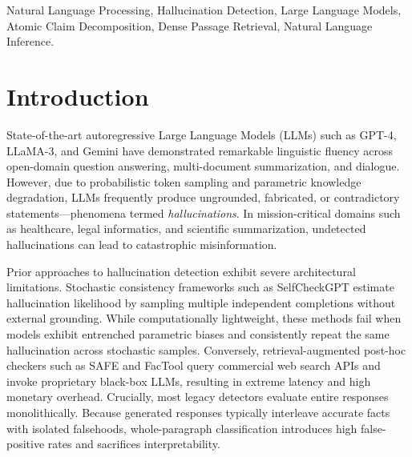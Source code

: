 \documentclass[conference]{IEEEtran}
\begin{document}
\begin{IEEEkeywords}
Natural Language Processing, Hallucination Detection, Large Language Models, Atomic Claim Decomposition, Dense Passage Retrieval, Natural Language Inference.
\end{IEEEkeywords}

\section{Introduction}
State-of-the-art autoregressive Large Language Models (LLMs) such as GPT-4, LLaMA-3, and Gemini have demonstrated remarkable linguistic fluency across open-domain question answering, multi-document summarization, and dialogue. However, due to probabilistic token sampling and parametric knowledge degradation, LLMs frequently produce ungrounded, fabricated, or contradictory statements—phenomena termed \textit{hallucinations}. In mission-critical domains such as healthcare, legal informatics, and scientific summarization, undetected hallucinations can lead to catastrophic misinformation.

Prior approaches to hallucination detection exhibit severe architectural limitations. Stochastic consistency frameworks such as SelfCheckGPT \cite{manakul2023selfcheckgpt} estimate hallucination likelihood by sampling multiple independent completions without external grounding. While computationally lightweight, these methods fail when models exhibit entrenched parametric biases and consistently repeat the same hallucination across stochastic samples. Conversely, retrieval-augmented post-hoc checkers such as SAFE \cite{wei2024safe} and FacTool \cite{chern2023factool} query commercial web search APIs and invoke proprietary black-box LLMs, resulting in extreme latency and high monetary overhead. Crucially, most legacy detectors evaluate entire responses monolithically. Because generated responses typically interleave accurate facts with isolated falsehoods, whole-paragraph classification introduces high false-positive rates and sacrifices interpretability.
\end{document}
